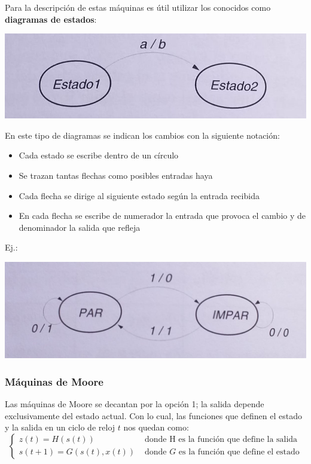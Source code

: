 \documentclass[a4paper,10pt]{book}
\begin{document}
Para la descripción de estas máquinas es útil utilizar los conocidos como \textbf{diagramas de estados}:
\begin{center}
\includegraphics[scale=0.45]{diagrama1}
\end{center}

En este tipo de diagramas se indican los cambios con la siguiente notación:
\begin{itemize}
\item Cada estado se escribe dentro de un círculo
\item Se trazan tantas flechas como posibles entradas haya
\item Cada flecha se dirige al siguiente estado según la entrada recibida
\item En cada flecha se escribe de numerador la entrada que provoca el cambio y de denominador la salida que refleja
\end{itemize}

Ej.:
\begin{center}
\includegraphics[scale=0.30]{ejemplo_diagrama1}
\end{center}

\subsubsection*{Máquinas de Moore}
Las máquinas de Moore se decantan por la opción 1; la salida depende exclusivamente del estado actual. Con lo cual, las funciones que definen el estado y la salida en un ciclo de reloj $t$ nos quedan como:
$$\begin{cases} z(t)=H(s(t)) & \mbox{ donde H es la función que define la salida} \\ s(t+1)=G(s(t),x(t)) & \mbox{ donde }G\mbox{ es la función que define el estado}\end{cases}$$
\end{document}
